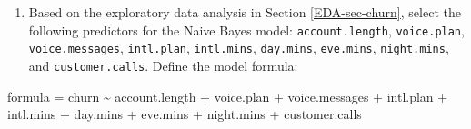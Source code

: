 \documentclass[
  11pt,
]{book}
\makeatletter
\newenvironment{Shaded}{}{}
\newcommand{\NormalTok}[1]{#1}
\newcommand{\OtherTok}[1]{\textcolor[rgb]{0.39,0.39,0.39}{#1}}
\newcommand{\SpecialCharTok}[1]{\textcolor[rgb]{0.39,0.39,0.39}{#1}}
\providecommand{\tightlist}{%
  \setlength{\itemsep}{0pt}\setlength{\parskip}{0pt}}
\newenvironment{kframe}{%
\medskip{}
\setlength{\fboxsep}{.8em}
 \def\at@end@of@kframe{}%
 \ifinner\ifhmode%
  \def\at@end@of@kframe{\end{minipage}}%
  \begin{minipage}{\columnwidth}%
 \fi\fi%
 \def\FrameCommand##1{\hskip\@totalleftmargin \hskip-\fboxsep
 \colorbox{shadecolor}{##1}\hskip-\fboxsep
     \hskip-\linewidth \hskip-\@totalleftmargin \hskip\columnwidth}%
 \MakeFramed {\advance\hsize-\width
   \@totalleftmargin\z@ \linewidth\hsize
   \@setminipage}}%
 {\par\unskip\endMakeFramed%
 \at@end@of@kframe}
\renewenvironment{Shaded}{\begin{kframe}}{\end{kframe}}
\theoremstyle{definition}
\theoremstyle{definition}
\theoremstyle{definition}
\theoremstyle{definition}
\theoremstyle{remark}
\makeatother
\begin{document}
\begin{enumerate}
\def\labelenumi{\arabic{enumi}.}
\setcounter{enumi}{20}
\tightlist
\item
  Based on the exploratory data analysis in Section \ref{EDA-sec-churn}, select the following predictors for the Naive Bayes model: \texttt{account.length}, \texttt{voice.plan}, \texttt{voice.messages}, \texttt{intl.plan}, \texttt{intl.mins}, \texttt{day.mins}, \texttt{eve.mins}, \texttt{night.mins}, and \texttt{customer.calls}. Define the model formula:
\end{enumerate}

\begin{Shaded}
\begin{Highlighting}[]
\NormalTok{formula }\OtherTok{=}\NormalTok{ churn }\SpecialCharTok{\textasciitilde{}}\NormalTok{ account.length }\SpecialCharTok{+}\NormalTok{ voice.plan }\SpecialCharTok{+}\NormalTok{ voice.messages }\SpecialCharTok{+} 
\NormalTok{                 intl.plan }\SpecialCharTok{+}\NormalTok{ intl.mins }\SpecialCharTok{+}\NormalTok{ day.mins }\SpecialCharTok{+}\NormalTok{ eve.mins }\SpecialCharTok{+} 
\NormalTok{                 night.mins }\SpecialCharTok{+}\NormalTok{ customer.calls}
\end{Highlighting}
\end{Shaded}
\end{document}
